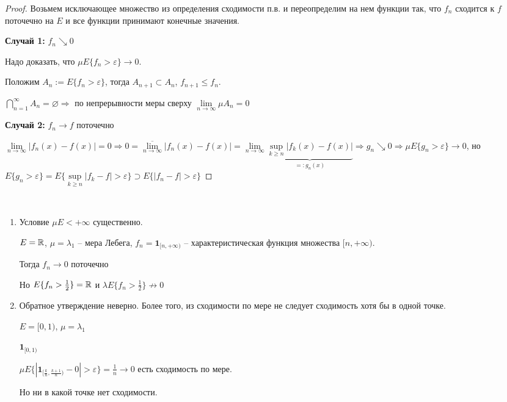 \begin{proof}
    Возьмем исключающее множество из определения сходимости п.в. и переопределим на 
    нем функции так, что $f_n$ сходится к $f$ поточечно на $E$ и все функции принимают конечные значения.

    \textbf{Случай 1:} $f_n \searrow 0$

    Надо доказать, что $\mu E\{f_n > \varepsilon\}\rightarrow 0$.

    Положим $A_n:=E\{f_n > \varepsilon\}$, тогда $A_{n+1}\subset A_n$, $f_{n+1}\leq f_n$.

    $\bigcap\limits_{n=1}^\infty A_n=\varnothing\Rightarrow$ по непрерывности меры 
    сверху $\lim\limits_{n\rightarrow \infty} \mu A_n = 0$

    \textbf{Случай 2:} $f_n \rightarrow f$ поточечно

    $\lim\limits_{n\rightarrow \infty} |f_n(x)-f(x)|=0\Rightarrow 0=
    \overline{\lim\limits_{n\rightarrow \infty}} |f_n(x)-f(x)|=\lim\limits_{n\rightarrow \infty} \underbrace{\underset{k\geq n}{\sup} |f_k(x)-f(x)|}_{=: g_n(x)}
    \Rightarrow g_n \searrow 0\Rightarrow \mu E \{g_n > \varepsilon\}\rightarrow 0$, но 
    $E \{g_n > \varepsilon\}=E\{\underset{k\geq n}{\sup} |f_k - f|> \varepsilon\}\supset 
    E\{|f_n - f|> \varepsilon\}$
\end{proof}

\begin{remark}~
    \begin{enumerate}
        \item Условие $\mu E < +\infty $ существенно.
        
        $E=\mathbb{R}$, $\mu =\lambda_1$ – мера Лебега, $f_n = \mathbf{1}_{[n, +\infty)}$ – 
        характеристическая функция множества $[n, +\infty)$.

        Тогда $f_n\rightarrow 0$ поточечно

        Но $E\{f_n > \frac{1}{2}\}=\mathbb{R}$ и $\lambda E\{f_n > \frac{1}{2}\} \not\rightarrow 0$

        \item Обратное утверждение неверно. Более того, из сходимости по мере не
        следует сходимость хотя бы в одной точке.

        $E=[0, 1)$, $\mu =\lambda_1$

        $\mathbf{1}_{[0, 1)}$

        $\mu E \{|\mathbf{1}_{[\frac{k}{n}, \frac{k+1}{n})} - 0|> \varepsilon\} 
        =\frac{1}{n}\rightarrow 0$ есть сходимость по мере.

        Но ни в какой точке нет сходимости.
    \end{enumerate}
\end{remark}


